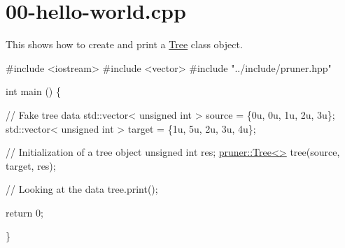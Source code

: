 \hypertarget{00-hello-world_8cpp-example}{}\section{00-\/hello-\/world.\+cpp}
This shows how to create and print a \hyperlink{classTree}{Tree} class object.


\begin{DoxyCodeInclude}
\textcolor{preprocessor}{#include <iostream>}
\textcolor{preprocessor}{#include <vector>}
\textcolor{preprocessor}{#include "../include/pruner.hpp"}

\textcolor{keywordtype}{int} main () \{
  
  \textcolor{comment}{// Fake tree data}
  std::vector< unsigned int > source = \{0u, 0u, 1u, 2u, 3u\};
  std::vector< unsigned int > target = \{1u, 5u, 2u, 3u, 4u\};

  \textcolor{comment}{// Initialization of a tree object}
  \textcolor{keywordtype}{unsigned} \textcolor{keywordtype}{int} res;
  \hyperlink{classpruner_1_1Tree}{pruner::Tree<>} tree(source, target, res);
  
  \textcolor{comment}{// Looking at the data}
  tree.print();         
  
  
  \textcolor{keywordflow}{return} 0;
  
\}
\end{DoxyCodeInclude}
 